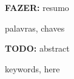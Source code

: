 \resumo
\textbf{FAZER:} resumo
\begin{keywords}
palavras, chaves
\end{keywords}

\abstract
\textbf{TODO:} abstract
\begin{keywords}
keywords, here
\end{keywords}
